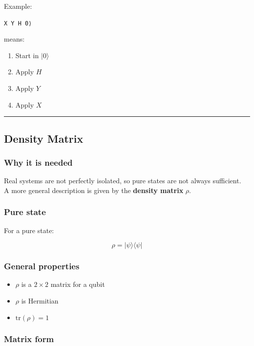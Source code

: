 \documentclass[
]{article}
\providecommand{\tightlist}{%
  \setlength{\itemsep}{0pt}\setlength{\parskip}{0pt}}
\begin{document}
Example:

\texttt{X\ Y\ H\ \textbar{}0⟩}

means:

\begin{enumerate}
\tightlist
\item
  Start in $|0\rangle$
\item
  Apply $H$
\item
  Apply $Y$
\item
  Apply $X$
\end{enumerate}

\begin{center}\rule{0.5\linewidth}{0.5pt}\end{center}

\subsection{Density Matrix}\label{density-matrix}

\subsubsection{Why it is needed}\label{why-it-is-needed}

Real systems are not perfectly isolated, so pure states are not always
sufficient.\\
A more general description is given by the \textbf{density matrix}
$\rho$.

\subsubsection{Pure state}\label{pure-state}

For a pure state:

\[
\rho = |\psi\rangle\langle\psi|
\]

\subsubsection{General properties}\label{general-properties}

\begin{itemize}
\tightlist
\item
  $\rho$ is a $2\times 2$ matrix for a qubit
\item
  $\rho$ is Hermitian
\item
  $\mathrm{tr}(\rho) = 1$
\end{itemize}

\subsubsection{Matrix form}\label{matrix-form}
\end{document}
